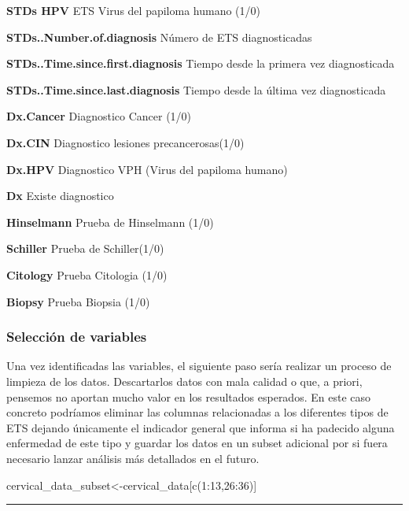 \documentclass[
]{article}
\newenvironment{Shaded}{\begin{snugshade}}{\end{snugshade}}
\newcommand{\DecValTok}[1]{\textcolor[rgb]{0.86,0.86,0.80}{#1}}
\newcommand{\FunctionTok}[1]{\textcolor[rgb]{0.94,0.94,0.56}{#1}}
\newcommand{\NormalTok}[1]{\textcolor[rgb]{0.80,0.80,0.80}{#1}}
\newcommand{\OtherTok}[1]{\textcolor[rgb]{0.94,0.94,0.56}{#1}}
\newcommand{\SpecialCharTok}[1]{\textcolor[rgb]{0.86,0.64,0.64}{#1}}
\begin{document}
\textbf{STDs HPV} ETS Virus del papiloma humano (1/0)

\textbf{STDs..Number.of.diagnosis} Número de ETS diagnosticadas

\textbf{STDs..Time.since.first.diagnosis} Tiempo desde la primera vez
diagnosticada

\textbf{STDs..Time.since.last.diagnosis} Tiempo desde la última vez
diagnosticada

\textbf{Dx.Cancer} Diagnostico Cancer (1/0)

\textbf{Dx.CIN} Diagnostico lesiones precancerosas(1/0)

\textbf{Dx.HPV} Diagnostico VPH (Virus del papiloma humano)

\textbf{Dx} Existe diagnostico

\textbf{Hinselmann} Prueba de Hinselmann (1/0)

\textbf{Schiller} Prueba de Schiller(1/0)

\textbf{Citology} Prueba Citologia (1/0)

\textbf{Biopsy} Prueba Biopsia (1/0)

\hypertarget{selecciuxf3n-de-variables}{%
\subsubsection{Selección de variables}\label{selecciuxf3n-de-variables}}

Una vez identificadas las variables, el siguiente paso sería realizar un
proceso de limpieza de los datos. Descartarlos datos con mala calidad o
que, a priori, pensemos no aportan mucho valor en los resultados
esperados. En este caso concreto podríamos eliminar las columnas
relacionadas a los diferentes tipos de ETS dejando únicamente el
indicador general que informa si ha padecido alguna enfermedad de este
tipo y guardar los datos en un subset adicional por si fuera necesario
lanzar análisis más detallados en el futuro.

\begin{Shaded}
\begin{Highlighting}[]
\NormalTok{cervical\_data\_subset}\OtherTok{\textless{}{-}}\NormalTok{cervical\_data[}\FunctionTok{c}\NormalTok{(}\DecValTok{1}\SpecialCharTok{:}\DecValTok{13}\NormalTok{,}\DecValTok{26}\SpecialCharTok{:}\DecValTok{36}\NormalTok{)]}
\end{Highlighting}
\end{Shaded}

\begin{center}\rule{0.5\linewidth}{0.5pt}\end{center}
\end{document}
